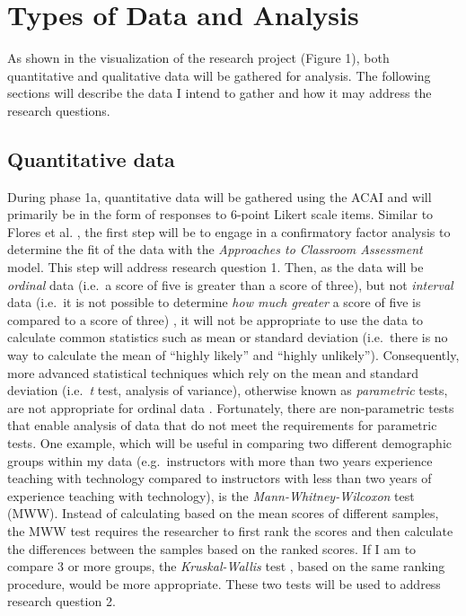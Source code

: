 \documentclass[
]{book}
\begin{document}
\hypertarget{types-of-data-and-analysis}{%
\section*{Types of Data and Analysis}\label{types-of-data-and-analysis}}

As shown in the visualization of the research project (Figure 1), both quantitative and qualitative data will be gathered for analysis. The following sections will describe the data I intend to gather and how it may address the research questions.

\hypertarget{quantitative-data}{%
\subsection*{Quantitative data}\label{quantitative-data}}

During phase 1a, quantitative data will be gathered using the ACAI and will primarily be in the form of responses to 6-point Likert scale items. Similar to Flores et al. \citeyearpar{floresPortugueseUniversityStudents2020}, the first step will be to engage in a confirmatory factor analysis to determine the fit of the data with the \emph{Approaches to Classroom Assessment} model. This step will address research question 1. Then, as the data will be \emph{ordinal} data (i.e.~a score of five is greater than a score of three), but not \emph{interval} data (i.e.~it is not possible to determine \emph{how much greater} a score of five is compared to a score of three) \citep{bulutLikertScalesFriend2021, jamiesonLikertScalesHow2004}, it will not be appropriate to use the data to calculate common statistics such as mean or standard deviation (i.e.~there is no way to calculate the mean of ``highly likely'' and ``highly unlikely''). Consequently, more advanced statistical techniques which rely on the mean and standard deviation (i.e.~\emph{t} test, analysis of variance), otherwise known as \emph{parametric} tests, are not appropriate for ordinal data \citep{fieldDiscoveringStatisticsUsing2018}. Fortunately, there are non-parametric tests that enable analysis of data that do not meet the requirements for parametric tests. One example, which will be useful in comparing two different demographic groups within my data (e.g.~instructors with more than two years experience teaching with technology compared to instructors with less than two years of experience teaching with technology), is the \emph{Mann-Whitney-Wilcoxon} test \citep{gaoNonparametricStatistics2010} (MWW). Instead of calculating based on the mean scores of different samples, the MWW test requires the researcher to first rank the scores and then calculate the differences between the samples based on the ranked scores. If I am to compare 3 or more groups, the \emph{Kruskal-Wallis} test \citep{gaoNonparametricStatistics2010}, based on the same ranking procedure, would be more appropriate. These two tests will be used to address research question 2.
\end{document}
